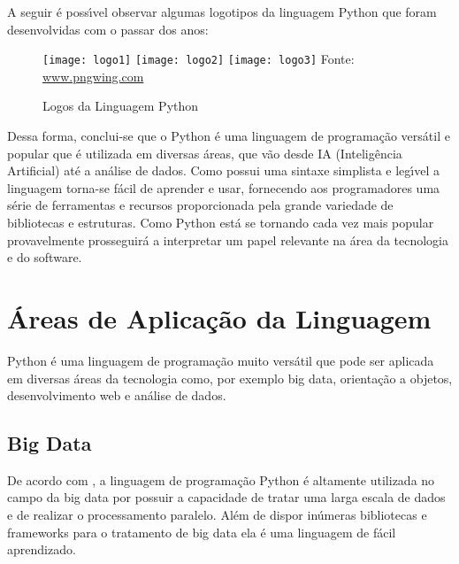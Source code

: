 A seguir \'{e} poss\'{\i}vel observar algumas logotipos da linguagem Python que foram desenvolvidas com o passar dos anos:

\begin{figure}[H]
\begin{center}
	\caption{Logos da Linguagem Python}
	\label{ling2}
	\texttt{[image: logo1]} \quad
	\texttt{[image: logo2]} \quad
	\texttt{[image: logo3]} \newline
	Fonte: \url{www.pngwing.com}
\end{center}
\end{figure}


Dessa forma, conclui-se que o Python \'{e} uma linguagem de programa\c{c}\~{a}o vers\'{a}til e popular que \'{e} utilizada em diversas \'{a}reas, que v\~{a}o desde IA (Intelig\^{e}ncia Artificial) at\'{e} a an\'{a}lise de dados. Como possui uma sintaxe simplista e leg\'{\i}vel a linguagem torna-se f\'{a}cil de aprender e usar, fornecendo aos programadores uma s\'{e}rie de ferramentas e recursos proporcionada pela grande variedade de bibliotecas e estruturas. Como Python est\'{a} se tornando cada vez mais popular provavelmente prosseguir\'{a} a interpretar um papel relevante na \'{a}rea da tecnologia e do software.
  
   \section{\'{A}reas de Aplica\c{c}\~{a}o da Linguagem}
Python \'{e} uma linguagem de programa\c{c}\~{a}o muito vers\'{a}til que pode ser aplicada em diversas \'{a}reas da tecnologia como, por exemplo big data, orienta\c{c}\~{a}o a objetos, desenvolvimento web e an\'{a}lise de dados.

        \subsection{Big Data}
De acordo com \cite{McKinney2018}, a linguagem de programa\c{c}\~{a}o Python \'{e} altamente utilizada no campo da big data por possuir a capacidade de tratar uma larga escala de dados e de realizar o processamento paralelo. Al\'{e}m de dispor in\'{u}meras bibliotecas e frameworks para o tratamento de big data ela \'{e} uma linguagem de f\'{a}cil aprendizado.\newline

